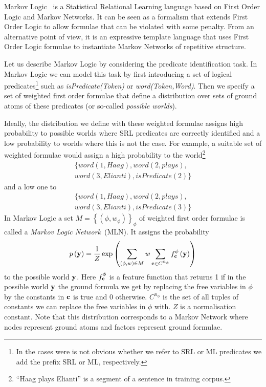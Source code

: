 

Markov Logic~\citep[ML,][]{richardson05markov} is a Statistical Relational Learning language based on First Order Logic and Markov Networks. It can be seen as a formalism that extends First Order Logic to allow formulae that can be violated
with some penalty. From an alternative point of view, it is an expressive
template language that uses First Order Logic formulae to instantiate
Markov Networks of repetitive structure. 

Let us describe Markov Logic by considering the predicate identification task. In Markov Logic we can model this task by first introducing a set of logical predicates\footnote{In the cases were is not obvious whether we refer to SRL or ML predicates we add the prefix SRL or ML, respectively.} such as \emph{isPredicate(Token)} or \emph{word(Token,Word)}. Then we specify a set of weighted first order formulae that define a distribution over sets of ground atoms of these predicates (or so-called \emph{possible worlds}). 

Ideally, the distribution we define with these weighted formulae assigns high probability to possible worlds where SRL predicates are correctly identified and a low probability to worlds where this is not the case. For example, a suitable set of weighted formulae would assign a high probability to the world\footnote{``Haag plays Elianti'' is a segment of a sentence in training corpus.}
\begin{eqnarray*}
 &\{ word\left(1,Haag\right),word(2,plays),\\
 & word(3,Elianti),isPredicate(2) \}& \end{eqnarray*}
and a low one to
\begin{eqnarray*}
& \{ word\left(1,Haag\right),word(2,plays),\\
 & word(3,Elianti),isPredicate(3) \} &\end{eqnarray*}
In Markov Logic a set $M=\left\{ \left(\phi,w_{\phi}\right)\right\} _{\phi}$ of weighted first order formulae is called a \emph{Markov Logic Network}~(MLN). It assigns the probability
\begin{equation}
p\left(\mathbf{y}\right)=\frac{1}{Z}\exp\left(
\sum_{\left(\phi,w\right)\in M} w
\sum_{\mathbf{c}\in C^{n_{\phi}}}f_{\mathbf{c}}^{\phi}\left(\mathbf{y}\right)
\right)
\label{eq:prob}
\end{equation}
to the possible world $\mathbf{y}$. Here $f_{\mathbf{c}}^{\phi}$ is a feature
function that returns 1 if in the possible world $\mathbf{y}$ the ground
formula we get by replacing the free variables in $\phi$ by the constants
in $\mathbf{c}$ is true and 0 otherwise. $C^{n_{\phi}}$ is the set
of all tuples of constants we can replace the free variables in $\phi$
with. $Z$ is a normalisation constant. Note that this distribution corresponds to a Markov Network where nodes represent ground atoms and factors represent ground formulae.

